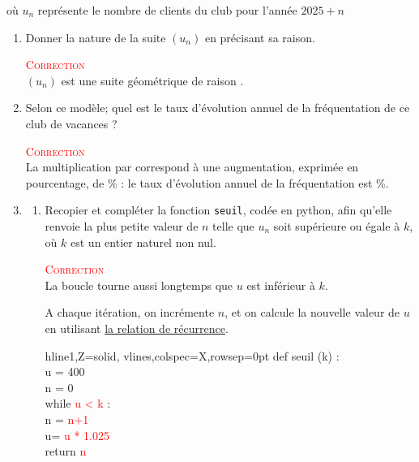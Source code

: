 où $u_n$ représente le nombre de clients du club pour l'année \mbox{$2025+n$}
\begin{enumerate}
	\item Donner la nature de la suite $(u_n)$ en précisant sa raison.

					\textcolor{red}{\textsc{Correction}}\\
					$(u_n)$ est une suite géométrique de raison .
	\item Selon ce modèle; quel est le taux d'évolution annuel de la fréquentation de ce club de vacances ?

					\textcolor{red}{\textsc{Correction}}\\
					La multiplication par  correspond à une augmentation, exprimée en pourcentage, de \% : le taux d'évolution annuel de la fréquentation est \%.
	\item
	 \begin{enumerate}
	\item
	\begin{minipage}[t]{0.66\linewidth}\vspace{0mm}
		Recopier et compléter la fonction \texttt{seuil}, codée en python, afin qu'elle renvoie la plus petite valeur de $n$ telle que $u_n$ soit supérieure ou égale à $k$, où $k$ est un entier naturel non nul.

				\textcolor{red}{\textsc{Correction}}\\
				La boucle \og{}tourne\fg{} aussi longtemps que $u$ est inférieur à $k$.

				A chaque itération, on incrémente $n$, et on calcule la nouvelle valeur de $u$ en utilisant \underline{la relation de récurrence}.
\end{minipage}
\hspace{0.05\linewidth}
	\begin{minipage}[t]{0.33\linewidth}\vspace{0cm}
	\begin{ttfamily}
\begin{tblr}{hline{1,Z}={solid}, vlines,colspec={X},rowsep=0pt}
	def seuil (k) :\\
	\qquad u = 400\\
	\qquad n = 0\\
	\qquad while  \textcolor{red}{u < k} :\\
	\qquad\qquad  n = \textcolor{red}{n+1}\\
	\qquad\qquad  u= \textcolor{red}{u * 1.025}\\
	\qquad return \textcolor{red}{n}\\
\end{tblr}
\end{ttfamily}
\end{minipage}



\end{enumerate}
\end{enumerate}
